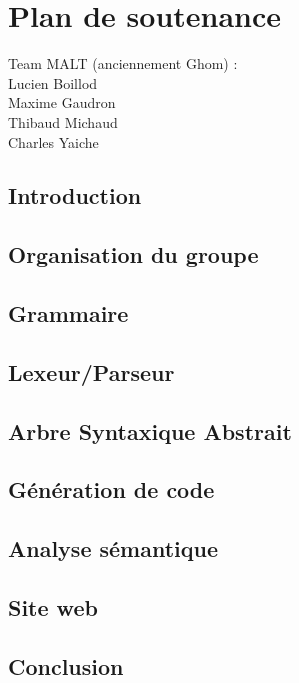 \documentclass{article}
\author{Lucien Boillod \\
Maxime Gaudron \\
Thibaud Michaud \\
Charles Yaiche
}
\begin{document}
\section*{Plan de soutenance}
\noindent Team MALT (anciennement Ghom) :\\
Lucien Boillod \\
Maxime Gaudron \\
Thibaud Michaud \\
Charles Yaiche \\

\subsection*{Introduction}
\subsection*{Organisation du groupe}
\subsection*{Grammaire}
\subsection*{Lexeur/Parseur}
\subsection*{Arbre Syntaxique Abstrait}
\subsection*{Génération de code}
\subsection*{Analyse sémantique}
\subsection*{Site web}
\subsection*{Conclusion}
\end{document}
